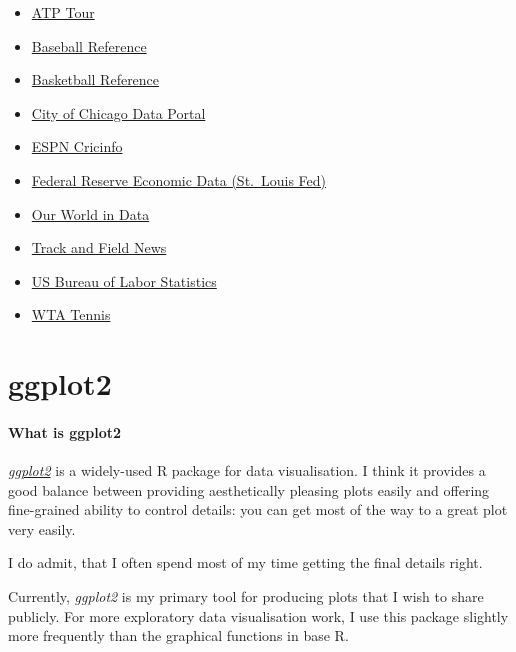 \documentclass[]{book}
\providecommand{\tightlist}{%
  \setlength{\itemsep}{0pt}\setlength{\parskip}{0pt}}
\begin{document}
\begin{itemize}
\tightlist
\item
  \href{https://www.atptour.com/}{ATP Tour}
\item
  \href{https://www.baseball-reference.com/}{Baseball Reference}
\item
  \href{https://www.basketball-reference.com/}{Basketball Reference}
\item
  \href{https://data.cityofchicago.org/}{City of Chicago Data Portal}
\item
  \href{https://www.espncricinfo.com/}{ESPN Cricinfo}
\item
  \href{https://fred.stlouisfed.org/}{Federal Reserve Economic Data (St.~Louis Fed)}
\item
  \href{https://ourworldindata.org/}{Our World in Data}
\item
  \href{https://trackandfieldnews.com/}{Track and Field News}
\item
  \href{https://www.bls.gov/}{US Bureau of Labor Statistics}
\item
  \href{https://www.wtatennis.com/}{WTA Tennis}
\end{itemize}

\hypertarget{ggplot}{%
\chapter*{ggplot2}\label{ggplot}}

\hypertarget{ggplotwhat}{%
\subsubsection*{What is ggplot2}\label{ggplotwhat}}

\href{https://ggplot2.tidyverse.org/}{\emph{ggplot2}} is a widely-used R package for data visualisation. I think it provides a good balance between providing aesthetically pleasing plots easily and offering fine-grained ability to control details: you can get most of the way to a great plot very easily.

I do admit, that I often spend most of my time getting the final details right.

Currently, \emph{ggplot2} is my primary tool for producing plots that I wish to share publicly.
For more exploratory data visualisation work, I use this package slightly more frequently than the graphical functions in base R.
\end{document}
